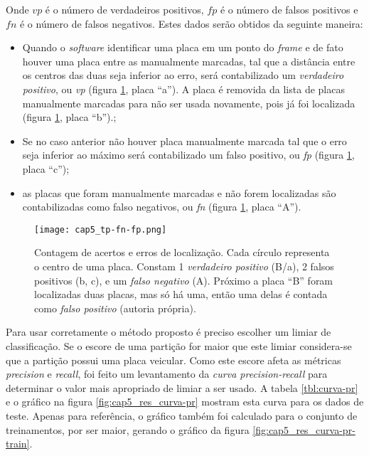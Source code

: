 Onde $vp$ é o número de verdadeiros positivos, $fp$ é o número de falsos
positivos e $fn$ é o número de falsos negativos. Estes dados serão obtidos da
seguinte maneira:

\begin{itemize}

\item Quando o \emph{software} identificar uma placa em um ponto do
	\emph{frame} e de fato houver uma placa entre as manualmente marcadas,
	tal que a distância entre
	os centros das duas seja inferior ao erro, será contabilizado um
	\emph{verdadeiro positivo}, ou \emph{vp} (figura \ref{fig:cap5_tp-fn-fp},
	placa ``a'').
	A placa é removida da lista de placas manualmente marcadas para não
	ser usada novamente, pois já foi localizada (figura
	\ref{fig:cap5_tp-fn-fp}, placa ``b'').;

\item Se no caso anterior não houver placa manualmente marcada tal que o erro
	seja inferior ao máximo será contabilizado um falso positivo, ou \emph{fp}
	(figura \ref{fig:cap5_tp-fn-fp}, placa ``c'');

\item as placas que foram manualmente marcadas e não forem localizadas são
	contabilizadas como falso negativos, ou \emph{fn} (figura
	\ref{fig:cap5_tp-fn-fp}, placa ``A'').

\end{itemize}

\begin{figure}[!htb]
	\centering
	\texttt{[image: cap5\_tp-fn-fp.png]}
	\caption[Contagem de acertos e erros de localização]{
		Contagem de acertos e erros de localização.
		Cada círculo representa o centro de uma placa. Constam 1 \emph{verdadeiro
		positivo} (B/a), 2 falsos positivos (b, c), e um \emph{falso negativo} (A).
		Próximo a placa ``B'' foram localizadas duas placas, mas
		só há uma, então uma delas é contada como \emph{falso positivo}
		(autoria própria).}
	\label{fig:cap5_tp-fn-fp}
\end{figure}

Para usar corretamente o método proposto é preciso escolher um limiar de
classificação. Se o escore de uma partição for maior que este limiar
considera-se que a partição possui uma placa veicular. Como este escore afeta
as métricas \emph{precision} e \emph{recall}, foi feito um levantamento da
\emph{curva precision-recall} para determinar o valor mais apropriado de limiar
a ser usado. A tabela \ref{tbl:curva-pr} e o gráfico na figura
\ref{fig:cap5_res_curva-pr} mostram esta curva para os dados de teste.
Apenas para
referência, o gráfico também foi calculado para o conjunto de treinamentos,
por ser maior, gerando o gráfico da figura \ref{fig:cap5_res_curva-pr-train}.

